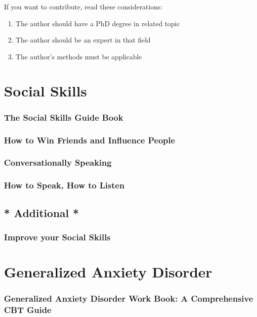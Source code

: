\documentclass[12pt, a4paper]{article}
\newcommand{\nl}{\vspace{\baselineskip}}
\begin{document}
\newpage

\begin{large}
	If you want to contribute, read these considerations:
	\begin{enumerate}
		\item The author should have a PhD degree in related topic
		\item The author should be an expert in that field
		\item The author's methods must be applicable
	\end{enumerate}
\end{large}

\newpage

\section*{Social Skills}
\subsubsection*{The Social Skills Guide Book}
\subsubsection*{How to Win Friends and Influence People}
\subsubsection*{Conversationally Speaking}
\subsubsection*{How to Speak, How to Listen}\nl
\subsection*{* Additional *}
\subsubsection*{Improve your Social Skills}\nl

\section*{Generalized Anxiety Disorder}
\subsubsection*{Generalized Anxiety Disorder Work Book: A Comprehensive CBT Guide}
\end{document}

